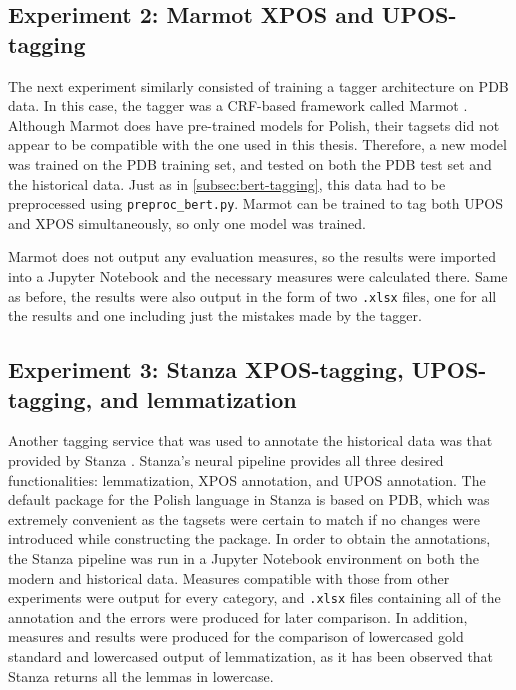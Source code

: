 \subsection{Experiment 2: Marmot XPOS and UPOS-tagging}
\label{subsec:marmot-tagging}

The next experiment similarly consisted of training a tagger architecture on PDB data. In this case, the tagger was a CRF-based framework called Marmot \citep{mueller-etal-2013-efficient}. Although Marmot does have pre-trained models for Polish, their tagsets did not appear to be compatible with the one used in this thesis. Therefore, a new model was trained on the PDB training set, and tested on both the PDB test set and the historical data. Just as in \autoref{subsec:bert-tagging}, this data had to be preprocessed using \texttt{preproc\_bert.py}. Marmot can be trained to tag both UPOS and XPOS simultaneously, so only one model was trained. 

Marmot does not output any evaluation measures, so the results were imported into a Jupyter Notebook and the necessary measures were calculated there. Same as before, the results were also output in the form of two \texttt{.xlsx} files, one for all the results and one including just the mistakes made by the tagger.

\subsection{Experiment 3: Stanza XPOS-tagging, UPOS-tagging, and lemmatization}
\label{subsec:stanza-tagging}

Another tagging service that was used to annotate the historical data was that provided by Stanza \citep{manning-etal-2014-stanford, qi2020stanza}. Stanza's neural pipeline provides all three desired functionalities: lemmatization, XPOS annotation, and UPOS annotation. The default package for the Polish language in Stanza is based on PDB, which was extremely convenient as the tagsets were certain to match if no changes were introduced while constructing the package. In order to obtain the annotations, the Stanza pipeline was run in a Jupyter Notebook environment on both the modern and historical data. Measures compatible with those from other experiments were output for every category, and \texttt{.xlsx} files containing all of the annotation and the errors were produced for later comparison. In addition, measures and results were produced for the comparison of lowercased gold standard and lowercased output of lemmatization, as it has been observed that Stanza returns all the lemmas in lowercase.

